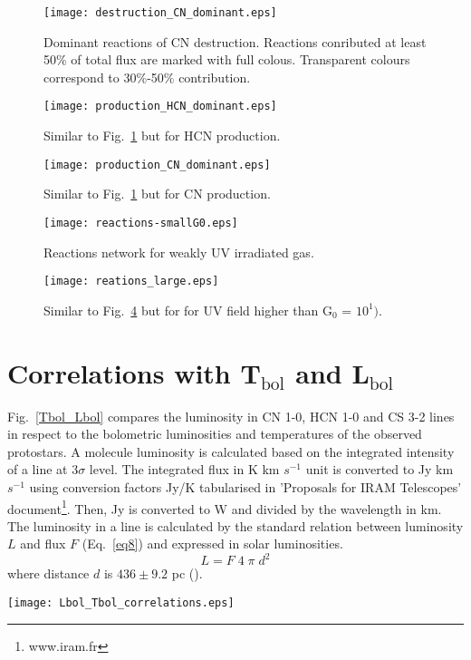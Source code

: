 \documentclass{aa}
\begin{document}
\begin{appendix}
\begin{figure} \texttt{[image: destruction\_CN\_dominant.eps]} \caption{Dominant reactions
of CN destruction. Reactions conributed at least 50$\%$ of total flux are marked with full colous.
Transparent colours correspond to 30$\%$-50$\%$ contribution.} \label{CN_dest} \end{figure}

\begin{figure} 
\texttt{[image: production\_HCN\_dominant.eps]} 
\caption{Similar to Fig.~\ref{CN_dest} but for HCN production.} 
\label{HCN_prod} 
\end{figure}

\begin{figure} 
\texttt{[image: production\_CN\_dominant.eps]} 
\caption{Similar to Fig.~\ref{CN_dest} but for CN production.} 
\label{CN_prod}
\end{figure}


\begin{figure} 
\texttt{[image: reactions-smallG0.eps]} 
\caption{Reactions network for weakly UV irradiated gas.} 
\label{reactions_smallG0} 
\end{figure}

\begin{figure} 
\texttt{[image: reations\_large.eps]} 
\caption{Similar to Fig.~\ref{reactions_smallG0} but for for UV field higher than G$_0$ = $10^{1})$.}
\label{reactions_largeG0} 
\end{figure}


\section{Correlations with T$_\mathrm{bol}$ and L$_\mathrm{bol}$} 

Fig.~\ref{Tbol_Lbol} compares the luminosity in CN 1-0, HCN 1-0 and CS 3-2 lines in respect to the bolometric luminosities and temperatures of the observed protostars. A molecule luminosity is calculated based on the integrated intensity of a line at 3$\sigma$ level. The integrated flux in K km $s^{-1}$ unit is converted to Jy km $s^{-1}$ using conversion factors Jy/K tabularised in 'Proposals for IRAM Telescopes' document\footnote{www.iram.fr}. Then, Jy is converted to W and divided by the wavelength in km. The luminosity in a line is calculated by the standard relation between luminosity $L$ and flux $F$ (Eq.~\ref{eq8}) and expressed in solar luminosities.
\begin{equation} 
\label{eq8} 
L = F \; 4 \; \pi \; d^{2}
\end{equation}
where distance $d$ is $436 \pm 9.2$ pc (\citealt{Ort17}).

\hspace*{-1.5in}
\begin{figure*} 
\texttt{[image: Lbol\_Tbol\_correlations.eps]} 
\caption{Correlations of lines luminosity with bolometric luminosity and temperature of protostars. Class 0 protostars are marked with red, while Class I with blue colour. The Pearson coefficient of the correlation (r) is shown.}
\label{Tbol_Lbol} 
\end{figure*}


\end{appendix}
\end{document}
